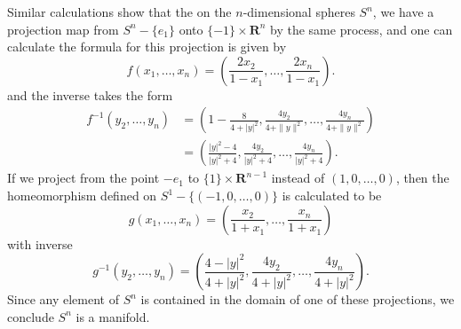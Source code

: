\begin{example}
%
%
%
%
%
    Similar calculations show that the on the $n$-dimensional spheres $S^n$, we have a projection map from $S^n - \{ e_1 \}$ onto $\{ -1 \} \times \mathbf{R}^n$ by the same process, and one can calculate the formula for this projection is given by
    \[ f(x_1, \dots, x_n) = \left( \frac{2x_2}{1 - x_1}, \dots, \frac{2x_n}{1 - x_1} \right). \]
    and the inverse takes the form
    \begin{align*}
        f^{-1}(y_2, \dots, y_n) &= \left(1 - \frac{8}{4 + |y|^2}, \frac{4y_2}{4 + \| y \|^2}, \dots, \frac{4y_n}{4 + \| y \|^2} \right)\\
        &= \left( \frac{|y|^2 - 4}{|y|^2 + 4}, \frac{4y_2}{|y|^2 + 4}, \dots, \frac{4y_n}{|y|^2 + 4} \right).
    \end{align*}
    If we project from the point $-e_1$ to $\{ 1 \} \times \mathbf{R}^{n-1}$ instead of $(1,0,\dots,0)$, then the homeomorphism defined on $S^1 - \{ (-1,0,\dots,0) \}$ is calculated to be
    \[ g(x_1, \dots, x_n) = \left( \frac{x_2}{1 + x_1}, \dots, \frac{x_n}{1 + x_1} \right) \]
    with inverse
    \[ g^{-1}(y_2, \dots, y_n) = \left( \frac{4 - |y|^2}{4 + |y|^2}, \frac{4y_2}{4 + |y|^2}, \dots, \frac{4y_n}{4 + |y|^2} \right). \]
    Since any element of $S^n$ is contained in the domain of one of these projections, we conclude $S^n$ is a manifold.
\end{example}


